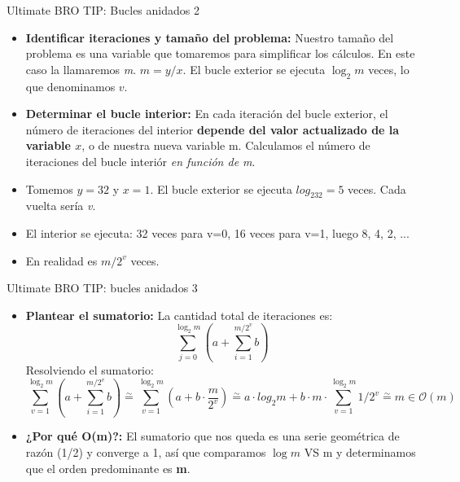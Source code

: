 \documentclass[aspectratio=169]{beamer}
\begin{document}
\begin{frame}{Ultimate BRO TIP: Bucles anidados 2}
\begin{itemize}
    \item \textbf{Identificar iteraciones y tamaño del problema:} 
    Nuestro tamaño del problema es una variable que tomaremos para simplificar los cálculos. En este caso la llamaremos \textit{m}. \(m = y/x\). El bucle exterior se ejecuta $\log_2 m$ veces, lo que denominamos $v$.
    
    \item \textbf{Determinar el bucle interior:} 
    En cada iteración del bucle exterior, el número de iteraciones del interior \textbf{depende del valor actualizado de la variable $x$}, o de nuestra nueva variable m. Calculamos el número de iteraciones del bucle interiór \textit{en función de m}.

    \item Tomemos \(y = 32\) y \(x = 1\). El bucle exterior se ejecuta \(log_232 = 5\) veces. Cada vuelta sería \textit{v}.
    \item El interior se ejecuta: 32 veces para v=0, 16 veces para v=1, luego 8, 4, 2, ...
    \item En realidad es \(m/2^v\) veces.
\end{itemize}
\end{frame}

\begin{frame}{Ultimate BRO TIP: bucles anidados 3}
\begin{itemize}

    \item \textbf{Plantear el sumatorio:} 
    La cantidad total de iteraciones es:
    \[
        \sum_{j=0}^{\log_2 m} (a + \sum_{i=1}^{m/2^v} b)
    \]
    Resolviendo el sumatorio:
\[
\sum_{v=1}^{\log_2 m} \left( a + \sum_{i=1}^{m/2^v} b \right) \overset{\sim}{=} 
\sum_{v=1}^{\log_2 m} \left( a + b \cdot \frac{m}{2^v} \right) \overset{\sim}{=} a\cdot log_2m + b\cdot m \cdot \sum_{v=1}^{\log_2 m} 1/2^v  \overset{\sim}{=} m \in \mathcal{O}(m)
\]



    
    \item \textbf{¿Por qué O(m)?:} 
    El sumatorio que nos queda es una serie geométrica de razón (1/2) y converge a 1, así que comparamos \(\log m\) VS m y determinamos que el orden predominante es \textbf{m}.
  
\end{itemize}
\end{frame}
\end{document}

